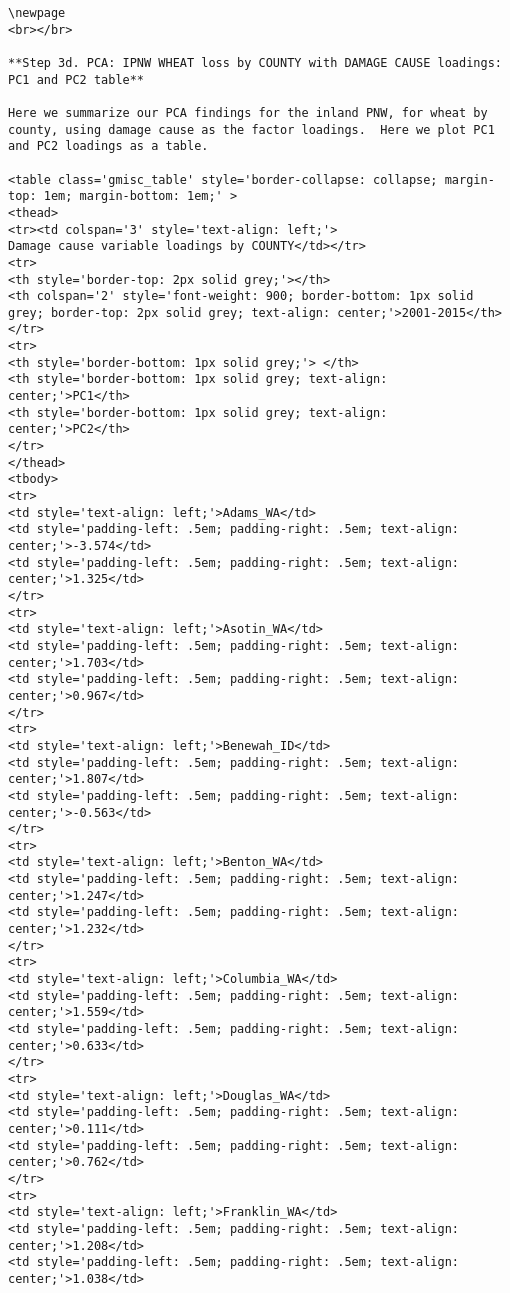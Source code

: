 \documentclass[]{article}
\begin{document}
\begin{verbatim}
\newpage
<br></br>

**Step 3d. PCA: IPNW WHEAT loss by COUNTY with DAMAGE CAUSE loadings: PC1 and PC2 table**

Here we summarize our PCA findings for the inland PNW, for wheat by county, using damage cause as the factor loadings.  Here we plot PC1 and PC2 loadings as a table.

<table class='gmisc_table' style='border-collapse: collapse; margin-top: 1em; margin-bottom: 1em;' >
<thead>
<tr><td colspan='3' style='text-align: left;'>
Damage cause variable loadings by COUNTY</td></tr>
<tr>
<th style='border-top: 2px solid grey;'></th>
<th colspan='2' style='font-weight: 900; border-bottom: 1px solid grey; border-top: 2px solid grey; text-align: center;'>2001-2015</th>
</tr>
<tr>
<th style='border-bottom: 1px solid grey;'> </th>
<th style='border-bottom: 1px solid grey; text-align: center;'>PC1</th>
<th style='border-bottom: 1px solid grey; text-align: center;'>PC2</th>
</tr>
</thead>
<tbody>
<tr>
<td style='text-align: left;'>Adams_WA</td>
<td style='padding-left: .5em; padding-right: .5em; text-align: center;'>-3.574</td>
<td style='padding-left: .5em; padding-right: .5em; text-align: center;'>1.325</td>
</tr>
<tr>
<td style='text-align: left;'>Asotin_WA</td>
<td style='padding-left: .5em; padding-right: .5em; text-align: center;'>1.703</td>
<td style='padding-left: .5em; padding-right: .5em; text-align: center;'>0.967</td>
</tr>
<tr>
<td style='text-align: left;'>Benewah_ID</td>
<td style='padding-left: .5em; padding-right: .5em; text-align: center;'>1.807</td>
<td style='padding-left: .5em; padding-right: .5em; text-align: center;'>-0.563</td>
</tr>
<tr>
<td style='text-align: left;'>Benton_WA</td>
<td style='padding-left: .5em; padding-right: .5em; text-align: center;'>1.247</td>
<td style='padding-left: .5em; padding-right: .5em; text-align: center;'>1.232</td>
</tr>
<tr>
<td style='text-align: left;'>Columbia_WA</td>
<td style='padding-left: .5em; padding-right: .5em; text-align: center;'>1.559</td>
<td style='padding-left: .5em; padding-right: .5em; text-align: center;'>0.633</td>
</tr>
<tr>
<td style='text-align: left;'>Douglas_WA</td>
<td style='padding-left: .5em; padding-right: .5em; text-align: center;'>0.111</td>
<td style='padding-left: .5em; padding-right: .5em; text-align: center;'>0.762</td>
</tr>
<tr>
<td style='text-align: left;'>Franklin_WA</td>
<td style='padding-left: .5em; padding-right: .5em; text-align: center;'>1.208</td>
<td style='padding-left: .5em; padding-right: .5em; text-align: center;'>1.038</td>

\end{verbatim}
\end{document}
